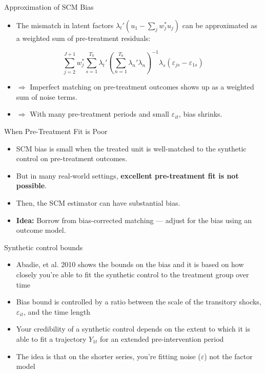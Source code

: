 \documentclass{beamer}
\begin{document}
\begin{frame}{Approximation of SCM Bias}
  \small
  \begin{itemize}
    \item The mismatch in latent factors $\lambda_t' (u_1 - \sum_j w_j^* u_j)$ can be approximated as a weighted sum of pre-treatment residuals:
  \end{itemize}

  \vspace{0.5cm}

  \[
  \sum_{j=2}^{J+1} w_j^* \sum_{s=1}^{T_0} 
  \lambda_t' \left( \sum_{n=1}^{T_0} \lambda_n' \lambda_n \right)^{-1} 
  \lambda_s (\varepsilon_{js} - \varepsilon_{1s})
  \]

  \vspace{0.5cm}

  \begin{itemize}
    \item $\Rightarrow$ Imperfect matching on pre-treatment outcomes shows up as a weighted sum of noise terms.
    \item $\Rightarrow$ With many pre-treatment periods and small $\varepsilon_{it}$, bias shrinks.
  \end{itemize}
\end{frame}





\begin{frame}{When Pre-Treatment Fit is Poor}
  \begin{itemize}
    \item SCM bias is small when the treated unit is well-matched to the synthetic control on pre-treatment outcomes.
    \item But in many real-world settings, \textbf{excellent pre-treatment fit is not possible}.
    \item Then, the SCM estimator can have substantial bias.
    \item \textbf{Idea:} Borrow from bias-corrected matching — adjust for the bias using an outcome model.
  \end{itemize}
\end{frame}

\begin{frame}{Synthetic control bounds}

\begin{itemize}
  \item Abadie, et al. 2010 shows the bounds on the bias and it is based on how closely you're able to fit the synthetic control to the treatment group over time
  \item Bias bound is controlled by a ratio between the scale of the transitory shocks, $\varepsilon_{it}$, and the time length
  \item Your credibility of a synthetic control depends on the extent to which it is able to fit a trajectory  $Y_{1t}$ for an extended pre-intervention period
  \item The idea is that on the shorter series, you're fitting noise ($\varepsilon$) not the factor model
 \end{itemize}
 
 \end{frame}
\end{document}
